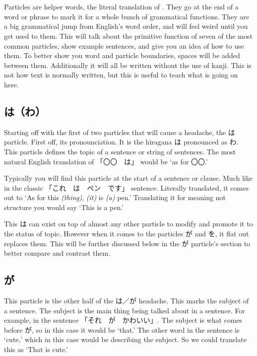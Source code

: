 \section[助詞]{}\label{sec:PR;文法;助詞}

Particles are helper words, the literal translation of . They go at the end of a word or phrase to mark it for a whole bunch of grammatical functions. They are a big grammatical jump from English's word order, and will feel weird until you get used to them. This will talk about the primitive function of seven of the most common particles, show example sentences, and give you an idea of how to use them. To better show you word and particle boundaries, spaces will be added between them. Additionally it will all be written without the use of kanji. This is not how text is normally written, but this is useful to teach what is going on here.

\subsection*{は（わ）}\label{ssec:PR;文法;助詞;は}

Starting off with the first of two particles that will cause a headache, the は particle. First off, its pronounciation. It is the hiragana は pronounced as わ. This particle defines the topic of a sentence or string of sentences. The most natural English translation of 「〇〇　は」 would be `as for 〇〇.'

Typically you will find this particle at the start of a sentence or clause. Much like in the classic 「これ　は　ペン　です」 sentence. Literally translated, it comes out to `As for this \textit{(thing)}, \textit{(it)} is \textit{(a)} pen.' Translating it for meaning not structure you would say `This is a pen.'

This は can exist on top of almost any other particle to modify and promote it to the status of topic. However when it comes to the particles が and を, it flat out replaces them. This will be further discussed below in the が particle's section to better compare and contrast them.

\subsection*{が}\label{ssec:PR;文法;助詞;が}

This particle is the other half of the は／が headache. This marks the subject of a sentence. The subject is the main thing being talked about in a sentence. For example, in the sentence 「それ　が　かわいい」. The subject is what comes before が, so in this case it would be `that.' The other word in the sentence is `cute,' which in this case would be describing the subject. So we could translate this as `That is cute.'

